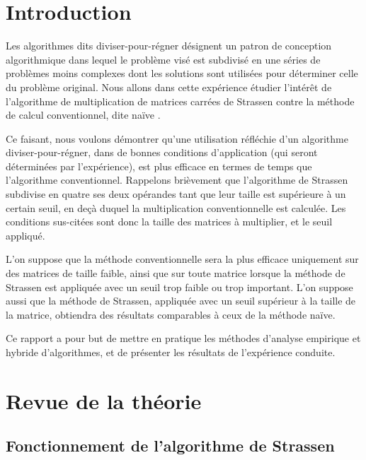 \documentclass[10pt,a4paper]{article}
\begin{document}
\newpage

\hfill

\newpage

\tableofcontents

\newpage

\section{Introduction}

Les algorithmes dits \og diviser-pour-régner \fg désignent un patron de conception algorithmique dans lequel le problème visé est subdivisé en une séries de problèmes moins complexes dont les solutions sont utilisées pour déterminer celle du problème original. Nous allons dans cette expérience étudier l'intérêt de l'algorithme de multiplication de matrices carrées de Strassen contre la méthode de calcul conventionnel, dite \og naïve \fg.

Ce faisant, nous voulons démontrer qu'une utilisation réfléchie d'un algorithme diviser-pour-régner, dans de bonnes conditions d'application (qui seront déterminées par l'expérience), est plus efficace en termes de temps que l'algorithme conventionnel. Rappelons brièvement que l'algorithme de Strassen subdivise en quatre ses deux opérandes tant que leur taille est supérieure à un certain seuil, en deçà duquel la multiplication conventionnelle est calculée. Les conditions sus-citées sont donc la taille des matrices à multiplier, et le seuil appliqué.

L'on suppose que la méthode conventionnelle sera la plus efficace uniquement sur des matrices de taille faible, ainsi que sur toute matrice lorsque la méthode de Strassen est appliquée avec un seuil trop faible ou trop important. L'on suppose aussi que la méthode de Strassen, appliquée avec un seuil supérieur à la taille de la matrice, obtiendra des résultats comparables à ceux de la méthode naïve.

Ce rapport a pour but de mettre en pratique les méthodes d'analyse empirique et hybride d'algorithmes, et de présenter les résultats de l'expérience conduite.

\section{Revue de la théorie}
\subsection{Fonctionnement de l'algorithme de Strassen}
\end{document}
